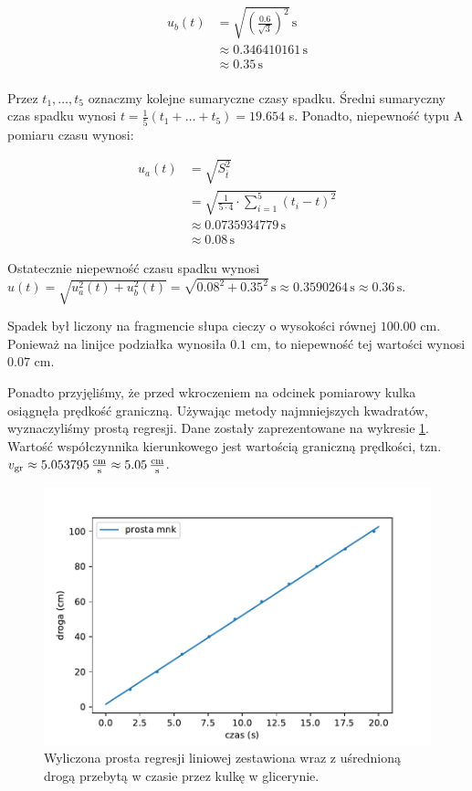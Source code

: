 \documentclass[a4paper]{article}
\begin{document}
\begin{align*}
	u_b(t) &= \sqrt{\left(\frac{0.6}{\sqrt 3}\right)^2} \, \text{s} \\
	&\approx 0.346410161 \, \text{s} \\
	&\approx 0.35 \, \text{s} \\
\end{align*}

Przez $t_1, \dots, t_5$ oznaczmy kolejne sumaryczne czasy spadku.
Średni sumaryczny czas spadku wynosi $t = \frac 1 5 (t_1 + \dots + t_5) = 19.654$ s.
Ponadto, niepewność typu A pomiaru czasu wynosi:

\begin{align*}
	u_a(t) &= \sqrt{S^{2}_{\overline{t}}} \\
	&= \sqrt{\frac{1}{5 \cdot 4} \cdot \sum_{i=1}^{5} (t_i - t)^2} \\
	&\approx 0.0735934779 \, \text{s} \\
	&\approx 0.08 \, \text{s}
\end{align*}

Ostatecznie niepewność czasu spadku wynosi $u(t) = \sqrt{u_a^2(t) + u_b^2(t)} = \sqrt{0.08^2 + 0.35^2} \, \text{s} \approx 0.3590264 \, \text{s} \approx 0.36\, \text{s}$.

Spadek był liczony na fragmencie słupa cieczy o wysokości równej $100.00$ cm.
Ponieważ na linijce podziałka wynosiła $0.1$ cm, to niepewność tej wartości wynosi $0.07$ cm.

Ponadto przyjęliśmy, że przed wkroczeniem na odcinek pomiarowy kulka osiągnęła prędkość graniczną.
Używając metody najmniejszych kwadratów, wyznaczyliśmy prostą regresji.
Dane zostały zaprezentowane na wykresie \ref{wykres_gliceryna}.
Wartość współczynnika kierunkowego jest wartością graniczną prędkości, tzn.
$v_{\text{gr}} \approx 5.053795 \, \frac{\text{cm}}{\text{s}} \approx 5.05 \, \frac{\text{cm}}{\text{s}}$.

\begin{figure}[h]
\centering
\includegraphics[scale=0.7]{regresja_gliceryna.pdf}
\caption{Wyliczona prosta regresji liniowej zestawiona wraz z uśrednioną drogą przebytą w czasie przez kulkę w glicerynie.}
\label{wykres_gliceryna}
\end{figure}
\end{document}
